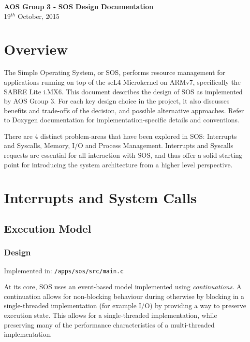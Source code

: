 \documentclass[a4paper,12pt]{article}
\begin{document}
\renewcommand{\headheight}{15pt}
\setlength{\parskip}{\baselineskip}%
\setlength{\parindent}{0pt}%
\begin{center}
  \vspace*{60mm}
  {\Large \bfseries{AOS Group 3 - SOS Design Documentation}}\\[8mm]
  19$^{th}$ October, 2015\\[20mm]
\end{center}
\newpage
\tableofcontents
\newpage
\section{Overview}
The Simple Operating System, or SOS, performs resource management for
applications running on top of the seL4 Microkernel on ARMv7, specifically the
SABRE Lite i.MX6.  This document describes the design of SOS as implemented by
AOS Group 3.  For each key design choice in the project, it also discusses
benefits and trade-offs of the decision, and possible alternative approaches.
Refer to Doxygen documentation for implementation-specific details and
conventions.

There are 4 distinct problem-areas that have been explored in SOS: Interrupts
and Syscalls, Memory, I/O and Process Management.  Interrupts and Syscalls
requests are essential for all interaction with SOS, and thus offer a solid
starting point for introducing the system architecture from a higher level
perspective.

\section{Interrupts and System Calls}
\subsection{Execution Model}
\subsubsection{Design}
Implemented in: \texttt{/apps/sos/src/main.c}

At its core, SOS uses an event-based model implemented using
\emph{continuations}.  A continuation allows for non-blocking behaviour during
otherwise by blocking in a single-threaded implementation (for example I/O) by
providing a way to preserve execution state.  This allows for a
single-threaded implementation, while preserving many of the performance
characteristics of a multi-threaded implementation.
\end{document}
